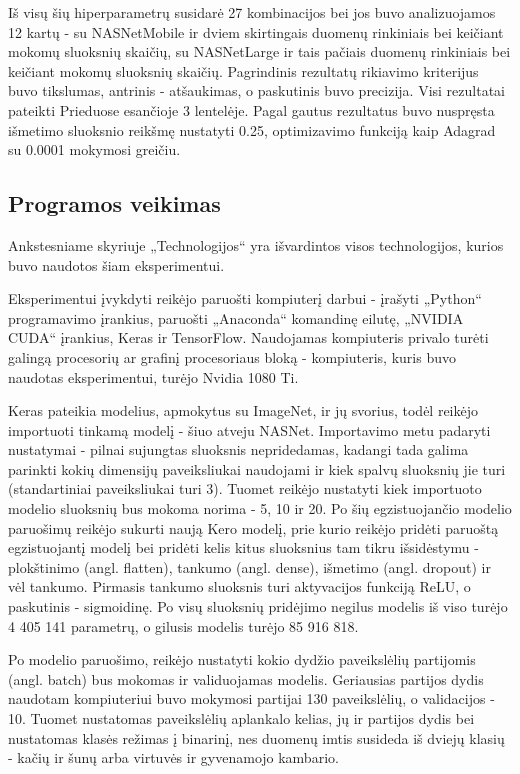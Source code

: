 \documentclass{VUMIFPSbakalaurinis}
\begin{document}
Iš visų šių hiperparametrų susidarė 27 kombinacijos bei jos buvo analizuojamos 12 kartų - su NASNetMobile ir dviem skirtingais duomenų rinkiniais bei keičiant mokomų sluoksnių skaičių, su NASNetLarge ir tais pačiais duomenų rinkiniais bei keičiant mokomų sluoksnių skaičių.
Pagrindinis rezultatų rikiavimo kriterijus buvo tikslumas, antrinis - atšaukimas, o paskutinis buvo precizija. Visi rezultatai pateikti Prieduose esančioje 3 lentelėje. 
Pagal gautus rezultatus buvo nuspręsta išmetimo sluoksnio reikšmę nustatyti 0.25, optimizavimo funkciją kaip Adagrad su 0.0001 mokymosi greičiu.


\subsection{Programos veikimas}
Ankstesniame skyriuje „Technologijos“ yra išvardintos visos technologijos, kurios buvo naudotos šiam eksperimentui.

Eksperimentui įvykdyti reikėjo paruošti kompiuterį darbui - įrašyti „Python“ programavimo įrankius, paruošti „Anaconda“ komandinę eilutę, „NVIDIA CUDA“ įrankius, Keras ir 
TensorFlow. Naudojamas kompiuteris privalo turėti galingą procesorių ar grafinį procesoriaus bloką - kompiuteris, kuris buvo naudotas eksperimentui, turėjo Nvidia 1080 Ti. 
 
Keras pateikia modelius, apmokytus su ImageNet, ir jų svorius, todėl reikėjo importuoti 
tinkamą modelį - šiuo atveju NASNet. Importavimo metu padaryti nustatymai - pilnai sujungtas sluoksnis nepridedamas, kadangi tada galima parinkti kokių dimensijų 
paveiksliukai naudojami ir kiek spalvų sluoksnių jie turi (standartiniai paveiksliukai turi 3). Tuomet reikėjo nustatyti kiek importuoto modelio sluoksnių bus mokoma norima - 5, 10 ir 20. 
Po šių egzistuojančio modelio paruošimų reikėjo sukurti naują Kero modelį, prie kurio reikėjo pridėti paruoštą egzistuojantį modelį bei pridėti kelis kitus sluoksnius tam tikru išsidėstymu - 
plokštinimo (angl. flatten), tankumo (angl. dense), išmetimo (angl. dropout) ir vėl tankumo. Pirmasis tankumo sluoksnis turi aktyvacijos funkciją ReLU, o paskutinis - sigmoidinę. 
Po visų sluoksnių pridėjimo negilus modelis iš viso turėjo 4 405 141 parametrų, o gilusis modelis turėjo 85 916 818.

Po modelio paruošimo, reikėjo nustatyti kokio dydžio paveikslėlių partijomis (angl. batch) bus mokomas ir validuojamas modelis. Geriausias partijos dydis naudotam kompiuteriui buvo mokymosi partijai 130 paveikslėlių, o validacijos - 10.
Tuomet nustatomas paveikslėlių aplankalo kelias, jų ir partijos dydis bei nustatomas klasės režimas į binarinį, nes duomenų imtis susideda iš dviejų klasių - kačių ir šunų arba virtuvės ir gyvenamojo kambario.
\end{document}
